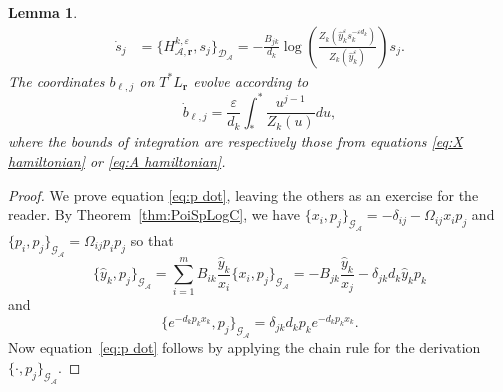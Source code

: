 \documentclass{amsart}
\newtheorem{lemma}[theorem]{Lemma}
\numberwithin{equation}{section}
\newcommand{\bfr}{{\boldsymbol{r}}}
\newcommand{\cA}{\mathcal{A}}
\newcommand{\cD}{\mathcal{D}}
\newcommand{\cG}{\mathcal{G}}
\begin{document}
\begin{lemma}
\begin{align}
    \label{eq:s dot}
    \dot s_j&=\{H_{\cA,\bfr}^{k,\varepsilon},s_j\}_{\cD_\cA}=-\frac{B_{jk}}{d_k}\log\left(\frac{Z_k\left(\hat y_k^\varepsilon s_k^{-\varepsilon d_k}\right)}{Z_k(\hat y_k^\varepsilon)}\right)s_j.
  \end{align}
  The coordinates $b_{\ell,j}$ on $T^*L_\bfr$ evolve according to
  \begin{equation}
    \label{eq:b dot}
    \dot b_{\ell,j}=\frac{\varepsilon}{d_k}\int_*^* \frac{u^{j-1}}{Z_k(u)}du,
  \end{equation}
  where the bounds of integration are respectively those from equations \eqref{eq:X hamiltonian} or \eqref{eq:A hamiltonian}.
\end{lemma}
\begin{proof}
  We prove equation \eqref{eq:p dot}, leaving the others as an exercise for the reader.
  By Theorem~\ref{thm:PoiSpLogC}, we have $\{x_i,p_j\}_{\cG_\cA}=-\delta_{ij}-\Omega_{ij}x_ip_j$ and $\{p_i,p_j\}_{\cG_\cA}=\Omega_{ij}p_ip_j$ so that
  \[\{\hat y_k,p_j\}_{\cG_\cA}=\sum_{i=1}^m B_{ik}\frac{\hat y_k}{x_i}\{x_i,p_j\}_{\cG_\cA}=-B_{jk}\frac{\hat y_k}{x_j}-\delta_{jk}d_k\hat y_kp_k\]
  and
  \[\{e^{-d_kp_kx_k},p_j\}_{\cG_\cA}=\delta_{jk}d_kp_ke^{-d_kp_kx_k}.\]
  Now equation~\eqref{eq:p dot} follows by applying the chain rule for the derivation $\{\cdot,p_j\}_{\cG_\cA}$.
\end{proof}
\end{document}
